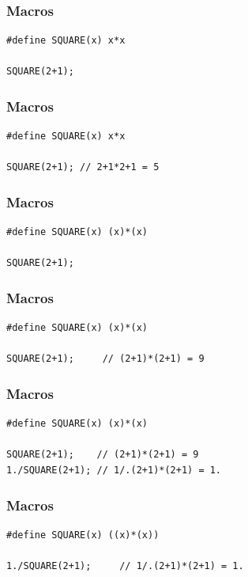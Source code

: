 \documentclass[12pt,compress]{beamer}
\begin{document}
\begin{frame}[fragile]
\frametitle{Macros}

\begin{lstlisting}
#define SQUARE(x) x*x

SQUARE(2+1);
\end{lstlisting}

\end{frame}

\begin{frame}[fragile]
\frametitle{Macros}

\begin{lstlisting}
#define SQUARE(x) x*x

SQUARE(2+1); // 2+1*2+1 = 5
\end{lstlisting}
\end{frame}


\begin{frame}[fragile]
\frametitle{Macros}

\begin{lstlisting}
#define SQUARE(x) (x)*(x)

SQUARE(2+1);
\end{lstlisting}
\end{frame}


\begin{frame}[fragile]
\frametitle{Macros}

\begin{lstlisting}
#define SQUARE(x) (x)*(x)

SQUARE(2+1);     // (2+1)*(2+1) = 9
\end{lstlisting}
\end{frame}


\begin{frame}[fragile]
\frametitle{Macros}

\begin{lstlisting}
#define SQUARE(x) (x)*(x)

SQUARE(2+1);    // (2+1)*(2+1) = 9
1./SQUARE(2+1); // 1/.(2+1)*(2+1) = 1.
\end{lstlisting}
\end{frame}


\begin{frame}[fragile]
\frametitle{Macros}

\begin{lstlisting}
#define SQUARE(x) ((x)*(x))

1./SQUARE(2+1);     // 1/.(2+1)*(2+1) = 1.
\end{lstlisting}
\end{frame}
\end{document}
